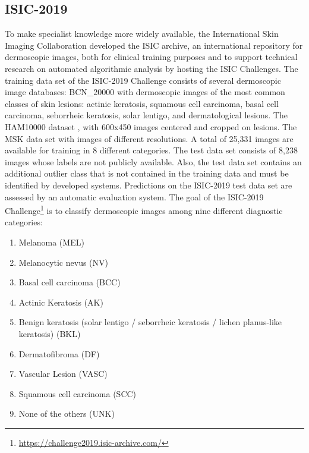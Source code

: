 \documentclass[journal]{IEEEtran}
\begin{document}
\subsection{ISIC-2019}
To make specialist knowledge more widely available, the International Skin Imaging Collaboration developed the ISIC archive, an international repository for dermoscopic images, both for clinical training purposes and to support technical research on automated algorithmic analysis by hosting the ISIC Challenges. The training data set of the ISIC-2019 Challenge consists of several dermoscopic image databases: BCN\_20000 \cite{combalia2019bcn20000} with dermoscopic images of the most common classes of skin lesions: actinic keratosis, squamous cell carcinoma, basal cell carcinoma, seborrheic keratosis, solar lentigo, and dermatological lesions. The HAM10000 dataset \cite{tschandl2018ham10000}, with 600x450 images centered and cropped on lesions. The MSK data set \cite{codella2018skin} with images of different resolutions. A total of 25,331 images are available for training in 8 different categories. The test data set consists of 8,238 images whose labels are not publicly available. Also, the test data set contains an additional outlier class that is not contained in the training data and must be identified by developed systems. Predictions on the ISIC-2019 test data set are assessed by an automatic evaluation system. The goal of the ISIC-2019 Challenge\footnote{\url{https://challenge2019.isic-archive.com/}} is to classify dermoscopic images among nine different diagnostic categories:
\begin{enumerate}
	\item  Melanoma (MEL)
	\item  Melanocytic nevus (NV)
	\item  Basal cell carcinoma (BCC)
	\item  Actinic Keratosis (AK)
	\item  Benign keratosis (solar lentigo / seborrheic keratosis / lichen planus-like keratosis) (BKL)
	\item  Dermatofibroma (DF)
	\item  Vascular Lesion (VASC)
	\item  Squamous cell carcinoma (SCC)
	\item  None of the others (UNK)
\end{enumerate}
\end{document}
